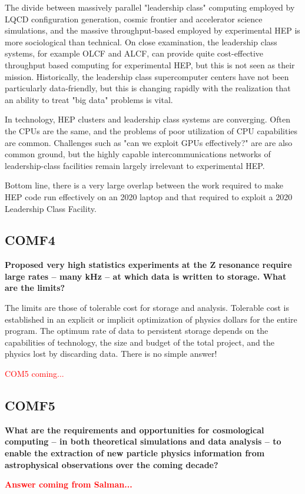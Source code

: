 The divide between massively parallel "leadership class" computing
employed by LQCD configuration generation, cosmic frontier and accelerator science simulations,
and the massive throughput-based
employed by experimental HEP is more sociological than technical.  On
close examination, the leadership class systems, for example OLCF and
ALCF, can provide quite cost-effective throughput based computing for
experimental HEP, but this is not seen as their mission.  Historically,
the leadership class supercomputer centers have not been particularly
data-friendly, but this is changing rapidly with the realization that an
ability to treat "big data" problems is vital.

In technology, HEP clusters and leadership class systems are converging.
Often the CPUs are the same, and the problems of poor utilization of CPU
capabilities are common. Challenges such as "can we exploit GPUs
effectively?" are are also common ground, but the highly capable
intercommunications networks of leadership-class facilities remain largely
irrelevant to experimental HEP.

Bottom line, there is a very large overlap between the work required to
make HEP code run effectively on an 2020 laptop and that required to
exploit a 2020 Leadership Class Facility.


\subsection{COMF4}

{\bf
 Proposed very high statistics experiments at the Z resonance require large rates --
many kHz -- at which data is written to storage. What are the limits?}


The limits are those of tolerable cost for storage and analysis.
Tolerable cost is established in an explicit or implicit optimization of
physics dollars for the entire program.  The optimum rate of data to persistent
storage depends on the capabilities of technology, the size and budget of
the total project, and the physics lost by discarding data. There is no
simple answer!

\textcolor{red} {COM5 coming...}
\subsection{COMF5}
 
 {\bf
 What are the requirements and opportunities for cosmological computing -- in both
theoretical simulations and data analysis -- to enable the extraction of new particle
physics information from astrophysical observations over the coming decade?}

\textcolor{red}{
{\bf Answer coming from Salman...}}








